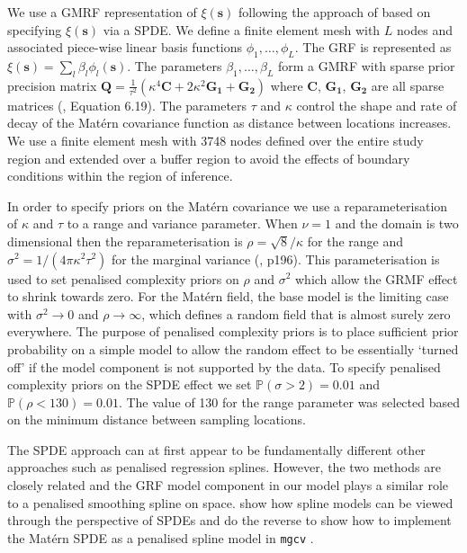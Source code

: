 \documentclass{statsoc}
\newcommand{\bs}{\mathbf{s}}
\newcommand{\bm}{\boldsymbol}  %
\begin{document}
We use a GMRF representation of $\xi(\bs)$ following the approach of \cite{lindgren_explicit_2011} based on specifying $\xi(\bs)$ via a SPDE.  We define a finite element mesh with $L$ nodes and associated piece-wise linear basis functions $\phi_1, \ldots, \phi_L$. The GRF is represented as $\xi(\bs) = \sum_l \beta_l \phi_l(\bs)$.  The parameters $\beta_1, \ldots, \beta_L$ form a GMRF with sparse prior precision matrix $\bm{Q} = \frac{1}{\tau^2}\left(\kappa^4\bm{C} + 2\kappa^2\bm{G_1} + \bm{G_2}\right)$ where $\bm{C}$, $\bm{G_1}$, $\bm{G_2}$ are all sparse matrices (\cite{blangiardo_spatial_2013}, Equation 6.19). The parameters $\tau$ and $\kappa$ control the shape and rate of decay of the Mat\'ern covariance function as distance between locations increases. We use a finite element mesh with 3748 nodes defined over the entire study region and extended over a buffer region to avoid the effects of boundary conditions within the region of inference.

In order to specify priors on the Mat\'ern covariance we use a reparameterisation of $\kappa$ and $\tau$ to a range and variance parameter.  When $\nu = 1$ and the domain is two dimensional then the reparameterisation is $\rho = \sqrt{8} / \kappa$ for the range and $\sigma^2 = 1 / (4\pi\kappa^2\tau^2)$ for the marginal variance (\cite{blangiardo_spatial_2013}, p196).  This parameterisation is used to set penalised complexity priors \citep{simpson_penalising_2017} on $\rho$ and $\sigma^2$ which allow the GRMF effect to shrink towards zero.  For the Mat\'ern field, the base model is the limiting case with $\sigma^2 \rightarrow 0$ and $\rho \rightarrow \infty$, which defines a random field that is almost surely zero everywhere.  The purpose of penalised complexity priors is to place sufficient prior probability on a simple model to allow the random effect to be essentially `turned off' if the model component is not supported by the data.  To specify penalised complexity priors on the SPDE effect we set $\mathbb{P}(\sigma > 2) = 0.01$ and $\mathbb{P}(\rho < 130) = 0.01$.  The value of 130 for the range parameter was selected based on the minimum distance between sampling locations.  

The SPDE approach can at first appear to be fundamentally different  other approaches such as penalised regression splines.  However, the two methods are closely related and the GRF model component in our model plays a similar role to a penalised smoothing spline on space.  \cite{yue_bayesian_2014} show how spline models can be viewed through the perspective of SPDEs and \cite{miller_UnderstandingStochasticPartial_2020} do the reverse to show how to implement the Mat\'ern SPDE as a penalised spline model in \texttt{mgcv} \citep{wood_gam_2017}.
\end{document}
